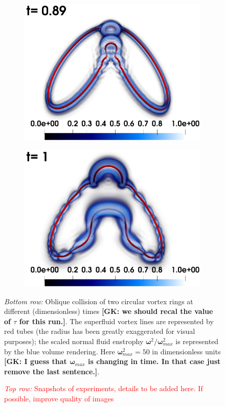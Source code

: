 \documentclass[%
 reprint,
 amsmath,amssymb,
 aps,
 prl,
]{revtex4-2}
\newcommand{\bom}{\boldsymbol{\omega}}
\def\red#1{\textcolor{red}{#1}}
\newcommand*{\NOTE}[1]{\textbf{\color{red}[#1]}}
\begin{document}
\begin{figure}[t]
\begin{subfigure}[b]{0.24\textwidth}
		\includegraphics*[width=\textwidth]{snap-3.png}
	\end{subfigure}
    \begin{subfigure}[b]{0.24\textwidth}
		\centering
		\includegraphics*[width=\textwidth]{snap-4.png}
	\end{subfigure}
\caption{\red{\emph{Top row:} Snapshots of experiments, details to be added here. If possible, improve quality of images}}
\emph{Bottom row:} Oblique collision of two circular vortex rings at different 
(dimensionless) times \NOTE{GK: we should recal the value of $\tau$ for this run.}.
The superfluid vortex lines are represented by red tubes (the radius has been greatly 
exaggerated for visual purposes); the scaled normal fluid enstrophy 
$\bom^2/\bom^2_{max}$ is represented by the blue volume rendering. Here $\bom^2_{max}=50$ in dimensionless units \NOTE{GK: I guess that $\bom_{max}$ is changing in time. In that case just remove the last sentence.}. 
\label{fig:ring-coll-viz}
\end{figure}
\end{document}

